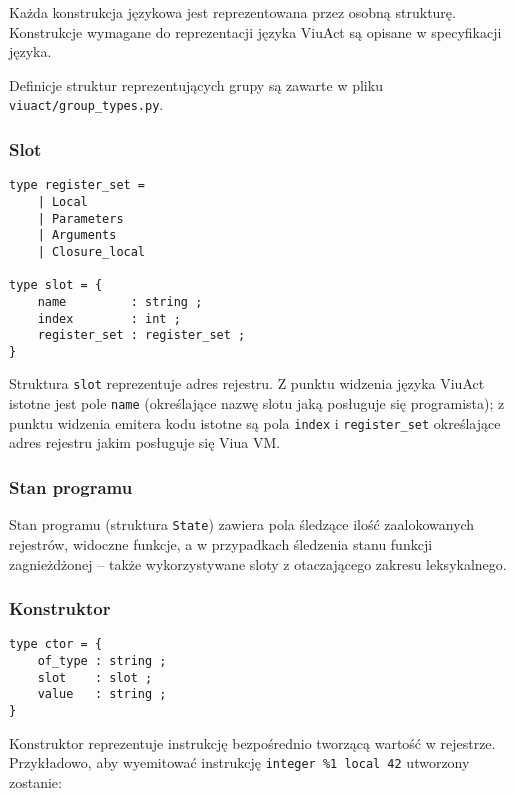 Każda konstrukcja językowa jest reprezentowana przez osobną strukturę. Konstrukcje wymagane do reprezentacji
języka ViuAct są opisane w specyfikacji języka.

Definicje struktur reprezentujących grupy są zawarte w pliku \texttt{viuact/group\_types.py}.

\subsubsection{Slot}
\label{diagram_klas_slot}

\begin{small}
\begin{lstlisting}
type register_set =
    | Local
    | Parameters
    | Arguments
    | Closure_local

type slot = {
    name         : string ;
    index        : int ;
    register_set : register_set ;
}
\end{lstlisting}
\end{small}

Struktura \texttt{slot} reprezentuje adres rejestru. Z punktu widzenia języka ViuAct istotne jest pole
\texttt{name} (określające nazwę slotu jaką posługuje się programista); z punktu widzenia emitera kodu istotne
są pola \texttt{index} i \texttt{register\_set} określające adres rejestru jakim posługuje się Viua VM.

\subsubsection{Stan programu}
\label{diagram_klas_stan_programu}

Stan programu (struktura \texttt{State}) zawiera pola śledzące ilość zaalokowanych rejestrów, widoczne
funkcje, a w przypadkach śledzenia stanu funkcji zagnieżdżonej -- także wykorzystywane sloty z otaczającego
zakresu leksykalnego.

\subsubsection{Konstruktor}
\label{diagram_klas_konstruktor}

\begin{small}
\begin{lstlisting}
type ctor = {
    of_type : string ;
    slot    : slot ;
    value   : string ;
}
\end{lstlisting}
\end{small}

Konstruktor reprezentuje instrukcję bezpośrednio tworzącą wartość w rejestrze. Przykładowo, aby wyemitować
instrukcję \texttt{integer \%1 local 42} utworzony zostanie:

